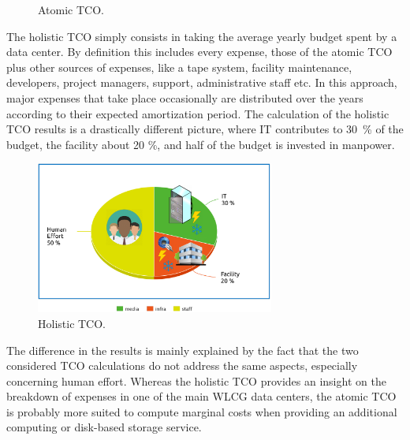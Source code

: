 \begin{figure}[h]
    \caption{Atomic TCO.}
    \label{fig:tco:atomic}
\end{figure}



The holistic TCO simply consists in taking the average yearly budget spent by a data center.
By definition this includes every expense, those of the atomic TCO plus other sources of expenses, like a tape system,
facility maintenance, developers, project managers, support, administrative staff etc.
In this approach, major expenses that take place occasionally
are distributed over the years according to their expected amortization period.
The calculation of the holistic TCO results is a drastically different picture,
where IT contributes to 30~\% of the budget, the facility about 20 \%, and half of the budget is invested in manpower.

\begin{figure}[h]
    \centering
    \includegraphics[height=5cm]{holistic_tco.png}
    \caption{Holistic TCO.}
    \label{fig:tco:holistic}
\end{figure}


The difference in the results is mainly explained by the fact that the two considered TCO calculations do not address
the same aspects, especially concerning human effort. Whereas the holistic TCO provides an insight on the breakdown
of expenses in one of the main WLCG data centers, the atomic TCO is probably more suited to compute marginal costs when
providing an additional computing or disk-based storage service.




